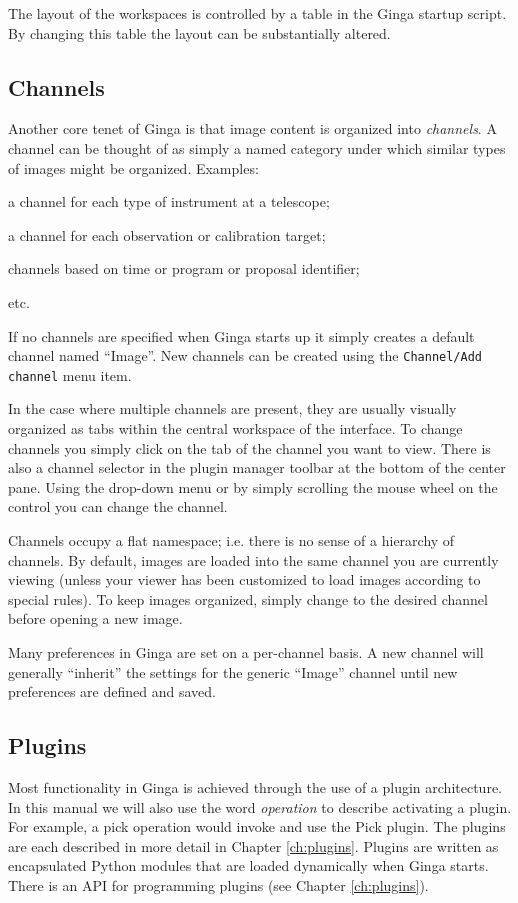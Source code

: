 \documentclass[11pt]{report}
\begin{document}
The layout of the workspaces is controlled by a table in the Ginga
startup script.  By changing this table the layout can be substantially
altered. 

\subsection{Channels}
Another core tenet of Ginga is that image content is organized
into {\em channels}.  A channel can be thought of as simply a named
category under which similar types of images might be organized.
Examples: 
\begin{itemize*}
\item a channel for each type of instrument at a telescope;
\item a channel for each observation or calibration target;
\item channels based on time or program or proposal identifier;
\item etc.
\end{itemize*}
If no channels are specified when Ginga starts up it simply creates a
default channel named ``Image''.  New channels can be created using the
{\tt Channel/Add channel} menu item.

In the case where multiple channels are present, they are usually visually
organized as tabs within the central workspace of the interface.  To
change channels you simply click on the tab of the channel you want to
view.  There is also a channel selector in the plugin manager toolbar at
the bottom of the center pane.  Using the drop-down menu or by simply
scrolling the mouse wheel on the control you can change the channel.

Channels occupy a flat namespace; i.e. there is no sense of a hierarchy
of channels.
By default, images are loaded into the same channel you are currently
viewing (unless your viewer has been customized to load images according
to special rules).
To keep images organized, simply change to the desired channel before
opening a new image. 

Many preferences in Ginga are set on a per-channel basis.  A new channel
will generally ``inherit'' the settings for the generic ``Image''
channel until new preferences are defined and saved.

\subsection{Plugins}
Most functionality in Ginga is achieved through the use of a plugin
architecture.
In this manual we will also use the word {\em operation} to describe activating
a plugin.  For example, a pick operation would invoke and use the Pick
plugin.  The plugins are each described in more detail in Chapter 
\ref{ch:plugins}.  Plugins are written as encapsulated Python modules
that are loaded dynamically when Ginga starts.  There is an API for
programming plugins (see Chapter \ref{ch:plugins}).  
\end{document}
